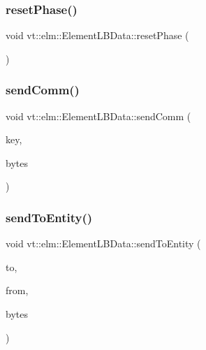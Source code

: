 \subsubsection{\texorpdfstring{reset\+Phase()}{resetPhase()}}
{\footnotesize\ttfamily void vt\+::elm\+::\+Element\+L\+B\+Data\+::reset\+Phase (\begin{DoxyParamCaption}{ }\end{DoxyParamCaption})}

\mbox{\label{structvt_1_1elm_1_1_element_l_b_data_ab7360fde34acf4dafafc8335617d8b6b}} 
\subsubsection{\texorpdfstring{send\+Comm()}{sendComm()}}
{\footnotesize\ttfamily void vt\+::elm\+::\+Element\+L\+B\+Data\+::send\+Comm (\begin{DoxyParamCaption}\item[{\hyperlink{structvt_1_1elm_1_1_comm_key}{elm\+::\+Comm\+Key}}]{key,  }\item[{double}]{bytes }\end{DoxyParamCaption})}

\mbox{\label{structvt_1_1elm_1_1_element_l_b_data_aa4d5faecce53f1ad3d4565a4e7b1cd10}} 
\subsubsection{\texorpdfstring{send\+To\+Entity()}{sendToEntity()}}
{\footnotesize\ttfamily void vt\+::elm\+::\+Element\+L\+B\+Data\+::send\+To\+Entity (\begin{DoxyParamCaption}\item[{\hyperlink{structvt_1_1elm_1_1_element_i_d_struct}{Element\+I\+D\+Struct}}]{to,  }\item[{\hyperlink{structvt_1_1elm_1_1_element_i_d_struct}{Element\+I\+D\+Struct}}]{from,  }\item[{double}]{bytes }\end{DoxyParamCaption})}

